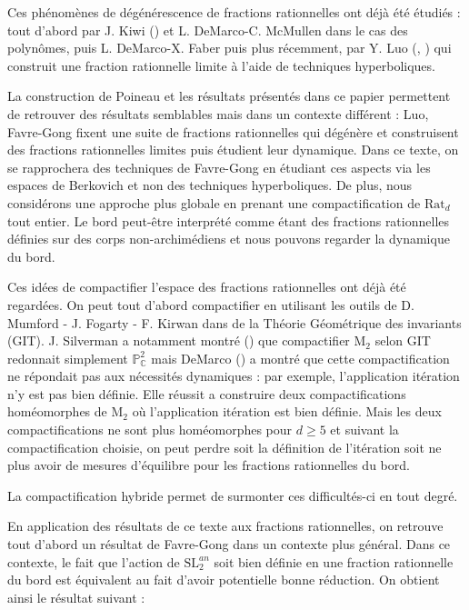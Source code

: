\documentclass[11pt]{article}
\newcommand{\C}{\mathbb{C}}
\newcommand{\p}{\mathbb{P}}
\newcommand{\Rat}{\mathrm{Rat}}
\newcommand{\SL}{\mathrm{SL}}
\newcommand{\M}{\mathrm{M}}
\begin{document}
Ces phénomènes de dégénérescence de fractions rationnelles ont déjà été étudiés : tout d'abord par J. Kiwi (\cite{KiwiPolynomialDynamics}) et L. DeMarco-C. McMullen \cite{DeMarcoMcMullenTreesDynamicsPolynomials} dans le cas des polynômes, puis L. DeMarco-X. Faber \cite{DeMarcoFaber} puis plus récemment, par Y. Luo (\cite{LuoLimitRationalMap}, \cite{LuoTreesBarycentricExtension}) qui construit une fraction rationnelle limite à l'aide de techniques hyperboliques. 

La construction de Poineau et les résultats présentés dans ce papier permettent de retrouver des résultats semblables mais dans un contexte différent : Luo, Favre-Gong fixent une suite de fractions rationnelles qui dégénère et construisent des fractions rationnelles limites puis étudient leur dynamique. Dans ce texte, on se rapprochera des techniques de Favre-Gong en étudiant ces aspects via les espaces de Berkovich et non des techniques hyperboliques. De plus, nous considérons une approche plus globale en prenant une compactification de $\Rat_d$ tout entier. Le bord peut-être interprété comme étant des fractions rationnelles définies sur des corps non-archimédiens et nous pouvons regarder la dynamique du bord.  

Ces idées de compactifier l'espace des fractions rationnelles ont déjà été regardées. On peut tout d'abord compactifier en utilisant les outils de D. Mumford - J. Fogarty - F. Kirwan dans \cite{GIT} de la Théorie Géométrique des invariants (GIT). J. Silverman a notamment montré (\cite{SilvermanSpaceRationalMaps}) que compactifier $\M_2$ selon GIT redonnait simplement $\p^2_\C$ mais DeMarco (\cite{DeMarcoSpaceQuadraticRationalMaps}) a montré que cette compactification ne répondait pas aux nécessités dynamiques : par exemple, l'application itération n'y est pas bien définie. Elle réussit a construire deux compactifications homéomorphes de $\M_2$ où l'application itération est bien définie. Mais les deux compactifications ne sont plus homéomorphes pour $d\geq 5$ et suivant la compactification choisie, on peut perdre soit la définition de l'itération soit ne plus avoir de mesures d'équilibre pour les fractions rationnelles du bord.

La compactification hybride permet de surmonter ces difficultés-ci en tout degré. 

En application des résultats de ce texte aux fractions rationnelles, on retrouve tout d'abord un résultat de Favre-Gong \cite{FavreGong} dans un contexte plus général. Dans ce contexte, le fait que l'action de $\SL_2^{an}$ soit bien définie en une fraction rationnelle du bord est équivalent au fait d'avoir potentielle bonne réduction. On obtient ainsi le résultat suivant :
\end{document}
